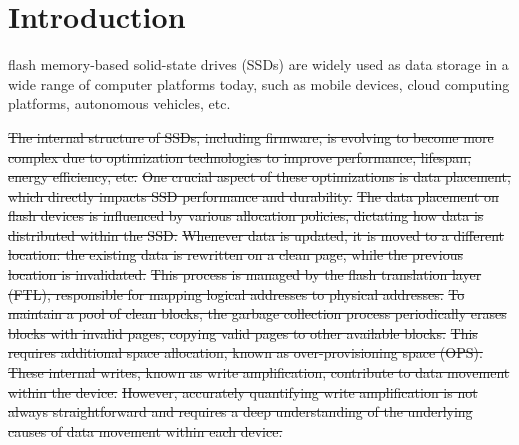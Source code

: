 \documentclass{ieeeaccess}
\begin{document}
\titlepgskip=-15pt

\maketitle
\section{Introduction}
\label{sec:introduction}
 flash memory-based solid-state drives (SSDs) are widely used as data storage in a wide range of computer platforms today, such as mobile devices, cloud computing platforms, autonomous vehicles, etc.

\sout{The internal structure of SSDs, including firmware, is evolving to become more complex due to optimization technologies to improve performance, lifespan, energy efficiency, etc.}
\sout{One crucial aspect of these optimizations is data placement, which directly impacts SSD performance and durability.} \sout{The data placement on flash devices is influenced by various allocation policies, dictating how data is distributed within the SSD.} \sout{Whenever data is updated, it is moved to a different location: the existing data is rewritten on a clean page, while the previous location is invalidated.} \sout{This process is managed by the flash translation layer (FTL), responsible for mapping logical addresses to physical addresses.}
\sout{To maintain a pool of clean blocks, the garbage collection process periodically erases blocks with invalid pages, copying valid pages to other available blocks.} \sout{This requires additional space allocation, known as over-provisioning space (OPS).} \sout{These internal writes, known as write amplification, contribute to data movement within the device.}
\sout{However, accurately quantifying write amplification is not always straightforward and requires a deep understanding of the underlying causes of data movement within each device.}
\end{document}
